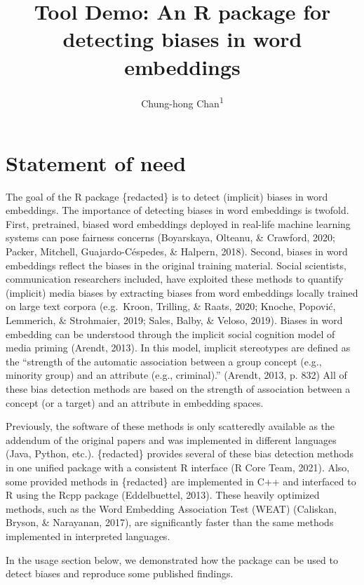 \documentclass[english,man,mask]{apa6}
\title{Tool Demo: An R package for detecting biases in word embeddings}
\author{Chung-hong Chan\textsuperscript{1}}
\date{}
\affiliation{\vspace{0.5cm}\textsuperscript{1} Mannheimer Zentrum für Europäische Sozialforschung}
\begin{document}
\maketitle

\hypertarget{statement-of-need}{%
\section{Statement of need}\label{statement-of-need}}

The goal of the R package \{redacted\} is to detect (implicit) biases in word embeddings. The importance of detecting biases in word embeddings is twofold. First, pretrained, biased word embeddings deployed in real-life machine learning systems can pose fairness concerns (Boyarskaya, Olteanu, \& Crawford, 2020; Packer, Mitchell, Guajardo-Céspedes, \& Halpern, 2018). Second, biases in word embeddings reflect the biases in the original training material. Social scientists, communication researchers included, have exploited these methods to quantify (implicit) media biases by extracting biases from word embeddings locally trained on large text corpora (e.g.~Kroon, Trilling, \& Raats, 2020; Knoche, Popović, Lemmerich, \& Strohmaier, 2019; Sales, Balby, \& Veloso, 2019). Biases in word embedding can be understood through the implicit social cognition model of media priming (Arendt, 2013). In this model, implicit stereotypes are defined as the \enquote{strength of the automatic association between a group concept (e.g., minority group) and an attribute (e.g., criminal).} (Arendt, 2013, p. 832) All of these bias detection methods are based on the strength of association between a concept (or a target) and an attribute in embedding spaces.

Previously, the software of these methods is only scatteredly available as the addendum of the original papers and was implemented in different languages (Java, Python, etc.). \{redacted\} provides several of these bias detection methods in one unified package with a consistent R interface (R Core Team, 2021). Also, some provided methods in \{redacted\} are implemented in C++ and interfaced to R using the Rcpp package (Eddelbuettel, 2013). These heavily optimized methods, such as the Word Embedding Association Test (WEAT) (Caliskan, Bryson, \& Narayanan, 2017), are significantly faster than the same methods implemented in interpreted languages.

In the usage section below, we demonstrated how the package can be used to detect biases and reproduce some published findings.
\end{document}
